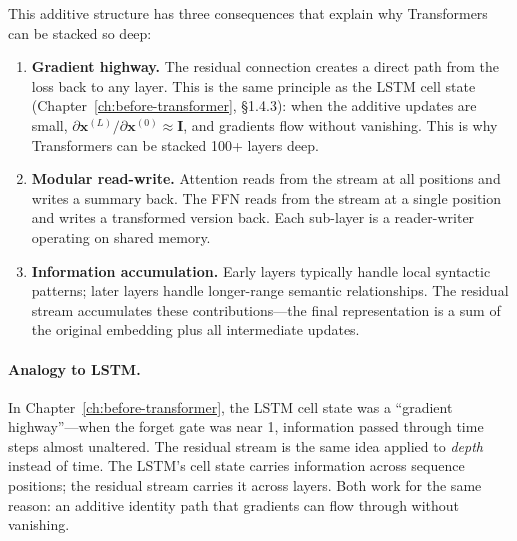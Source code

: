 This additive structure has three consequences that explain why Transformers can be stacked so deep:

\begin{enumerate}[nosep]
  \item \textbf{Gradient highway.} The residual connection creates a direct path from the loss back to any layer. This is the same principle as the LSTM cell state (Chapter~\ref{ch:before-transformer}, \S1.4.3): when the additive updates are small, $\partial \mathbf{x}^{(L)} / \partial \mathbf{x}^{(0)} \approx \mathbf{I}$, and gradients flow without vanishing. This is why Transformers can be stacked 100+ layers deep.

  \item \textbf{Modular read-write.} Attention reads from the stream at all positions and writes a summary back. The FFN reads from the stream at a single position and writes a transformed version back. Each sub-layer is a reader-writer operating on shared memory.

  \item \textbf{Information accumulation.} Early layers typically handle local syntactic patterns; later layers handle longer-range semantic relationships. The residual stream accumulates these contributions---the final representation is a sum of the original embedding plus all intermediate updates.
\end{enumerate}

\paragraph{Analogy to LSTM.} In Chapter~\ref{ch:before-transformer}, the LSTM cell state was a ``gradient highway''---when the forget gate was near 1, information passed through time steps almost unaltered. The residual stream is the same idea applied to \emph{depth} instead of time. The LSTM's cell state carries information across sequence positions; the residual stream carries it across layers. Both work for the same reason: an additive identity path that gradients can flow through without vanishing.

\medskip
\noindent{}

